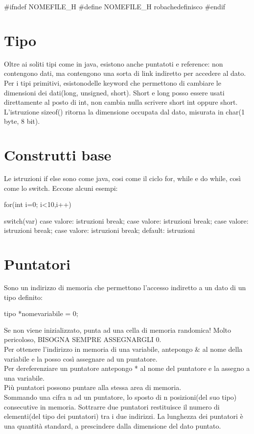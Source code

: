 \begin{cpp}
#ifndef NOMEFILE_H
#define NOMEFILE_H
robachedefinisco
#endif
\end{cpp}

\section{Tipo}
Oltre ai soliti tipi come in java, esistono anche puntatoti e reference: non contengono dati, ma contengono una sorta di link indiretto per accedere al dato.\\
Per i tipi primitivi, esistonodelle keyword che permettono di cambiare le dimensioni dei dati(long, unsigned, short). Short e long posso essere usati direttamente al posto di int, non cambia nulla scrivere short int oppure short.\\
L'istruzione sizeof() ritorna la dimensione occupata dal dato, misurata in char(1 byte, 8 bit).

\section{Construtti base}
Le istruzioni if else sono come java, cosi come il ciclo for, while e do while, così come lo switch. Eccone alcuni esempi:

\begin{cpp}
for(int i=0; i<10,i++){
		
}

switch(var){
		case valore: istruzioni break;
		case valore: istruzioni break;
		case valore: istruzioni break;
		case valore: istruzioni break;
		default: istruzioni
	}
\end{cpp}

\section{Puntatori}
Sono un indirizzo di memoria che permettono l'accesso indiretto a un dato di un tipo definito:

\begin{cpp}
tipo *nomevariabile = 0; 
\end{cpp}

Se non viene inizializzato, punta ad una cella di memoria randomica! Molto pericoloso, BISOGNA SEMPRE ASSEGNARGLI 0.\\
Per ottenere l'indirizzo in memoria di una variabile, antepongo \& al nome della variabile e la posso così assegnare ad un puntatore.\\
Per dereferenziare un puntatore antepongo * al nome del puntatore e la assegno a una variabile.\\
Più puntatori possono puntare alla stessa area di memoria.\\
Sommando una cifra n ad un puntatore, lo sposto di n posizioni(del suo tipo) consecutive in memoria. Sottrarre due puntatori restituisce il numero di elementi(del tipo dei puntatori) tra i due indirizzi. La lunghezza dei puntatori è una quantità standard, a prescindere dalla dimensione del dato puntato.

